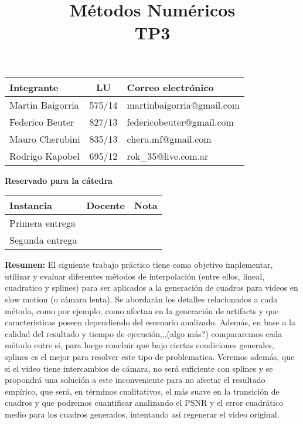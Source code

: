 \documentclass[10pt,a4paper]{article}
\title{Métodos Numéricos \\ TP3}
\begin{document}
\maketitle

\bigskip

\begin{table}[h]
\centering
\begin{tabular}{|l l l|}
\hline
Integrante       & \multicolumn{1}{c}{LU}     & Correo electrónico        \\ \hline
Martin Baigorria & \multicolumn{1}{c}{575/14} & martinbaigorria@gmail.com \\ 
Federico Beuter & 827/13                      & federicobeuter@gmail.com \\
Mauro Cherubini & 835/13                      & cheru.mf@gmail.com \\ 
Rodrigo Kapobel & 695/12                      & rok\_35@live.com.ar \\  \hline
\end{tabular}
\end{table}

\begin{center}
\textbf{Reservado para la cátedra}
\end{center}
\begin{table}[h]
\centering
\begin{tabular}{|l|l|l|}
\hline
Instancia       & Docente & Nota \\ \hline
Primera entrega &         &      \\ \hline
Segunda entrega &         &      \\ \hline
\end{tabular}
\end{table}

\vfill
\textbf{Resumen:} 
El siguiente trabajo práctico tiene como objetivo implementar, utilizar y evaluar diferentes métodos de interpolación (entre ellos, lineal, cuadratico y splines) para ser aplicados a la generación de cuadros para videos en slow motion (o cámara lenta). Se abordarán los detalles relacionados a cada método, como por ejemplo, como afectan en la generación de artifacts y que caracteristicas poseen dependiendo del escenario analizado. Además, en base a la calidad del resultado y tiempo de ejecución,,,(algo más?) compararemos cada método entre si, para luego concluir que bajo ciertas condiciones generales, splines es el mejor para resolver este tipo de problematica. Veremos además, que si el video tiene intercambios de cámara, no será suficiente con splines y se propondrá una solución a este inconveniente para no afectar el resultado empírico, que será, en términos cualitativos, el más suave en la transición de cuadros y que podremos cuantificar analizando el PSNR y el error cuadrático medio para los cuadros generados, intentando así regenerar el video original.
\end{document}

